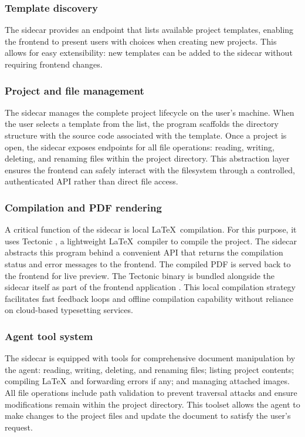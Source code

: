 \subsubsection{Template discovery}

The sidecar provides an endpoint that lists available project templates, enabling the frontend to present users with choices when creating new projects.
This allows for easy extensibility: new templates can be added to the sidecar without requiring frontend changes.

\subsubsection{Project and file management}

The sidecar manages the complete project lifecycle on the user's machine.
When the user selects a template from the list, the program scaffolds the directory structure with the source code associated with the template.
Once a project is open, the sidecar exposes endpoints for all file operations: reading, writing, deleting, and renaming files within the project directory.
This abstraction layer ensures the frontend can safely interact with the filesystem through a controlled, authenticated API rather than direct file access.

\subsubsection{Compilation and PDF rendering}

A critical function of the sidecar is local \LaTeX\ compilation.
For this purpose, it uses Tectonic \cite{tectonic}, a lightweight \LaTeX\ compiler to compile the project.
The sidecar abstracts this program behind a convenient API that returns the compilation status and error messages to the frontend.
The compiled PDF is served back to the frontend for live preview.
The Tectonic binary is bundled alongside the sidecar itself as part of the frontend application \cite{tauri_sidecar}.
This local compilation strategy facilitates fast feedback loops and offline compilation capability without reliance on cloud-based typesetting services.


\subsubsection{Agent tool system}

The sidecar is equipped with tools for comprehensive document manipulation by the agent: reading, writing, deleting, and renaming files; listing project contents; compiling \LaTeX\ and forwarding errors if any; and managing attached images.
All file operations include path validation to prevent traversal attacks and ensure modifications remain within the project directory.
This toolset allows the agent to make changes to the project files and update the document to satisfy the user's request.

